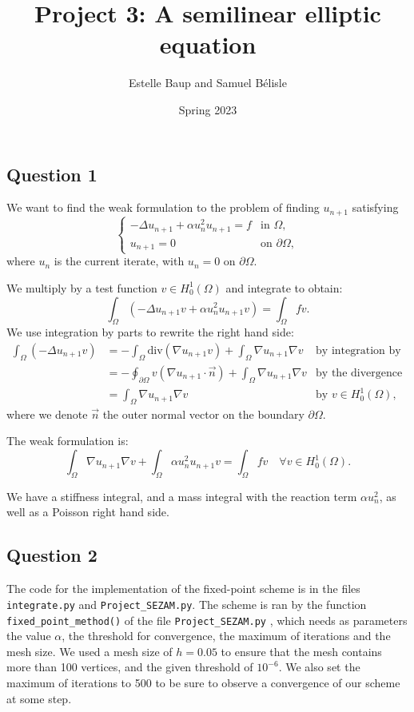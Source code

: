 \documentclass[11pt, a4paper, twoside]{article}
\newcommand{\grad}{\nabla} %
\renewcommand{\div}{\text{div}} %
\newcommand{\Hunz}{H^1_0(\Omega)}
\newcommand{\intom}{\int_\Omega}
\newcommand{\intbd}{\oint_{\partial \Omega}}
\begin{document}
\title{Project 3: A semilinear elliptic equation}
\author{Estelle Baup and Samuel Bélisle}
\date{Spring 2023}
\maketitle 

\subsection*{Question 1}
We want to find the weak formulation to the problem of finding $u_{n+1}$ satisfying
$$\begin{cases}  - \Delta u_{n+1} + \alpha u_n^2 u_{n+1} = f & \text{in } \Omega,\\
u_{n+1} = 0 &\text{on } \partial\Omega,
\end{cases}$$
where $u_n$ is the current iterate, with $u_n = 0$ on $\partial\Omega$.\newline

We multiply by a test function $v\in \Hunz$ and integrate to obtain:
$$\intom \left( -\Delta u_{n+1} v + \alpha u_n^2 u_{n+1} v \right) = \intom fv .$$
We use integration by parts to rewrite the right hand side:
\begin{align*}
 \intom (-\Delta u_{n+1} v)
 &= - \intom \div(\grad u_{n+1} v) + \intom \grad u_{n+1} \grad v
 	&\text{by integration by part}
 \\%
 &= - \intbd v (\grad u_{n+1} \cdot \vec n) + \intom \grad u_{n+1} \grad v
 	&\text{by the divergence theorem}
 \\%
 &=  \intom \grad u_{n+1} \grad v
 	&\text{by } v\in\Hunz,
\end{align*}
where we denote $\vec n$ the outer normal vector on the boundary $\partial \Omega$.

The weak formulation is:
\begin{equation}
\label{weak_f} \tag{E1}
\intom
\grad u_{n+1} \grad v
+ 
\intom
\alpha u_n^2 u_{n+1} v
= \intom fv
\quad \forall v\in\Hunz.
\end{equation}

We have a stiffness integral, and a mass integral with the reaction term $\alpha u_n^2$, as well as a Poisson right hand side.

\subsection*{Question 2}
The code for the implementation of the fixed-point scheme is in the files \verb+integrate.py+ and \verb+Project_SEZAM.py+. The scheme is ran by the function \verb+fixed_point_method()+ of the file  \verb+Project_SEZAM.py+ , which needs as parameters the value $\alpha$, the threshold for convergence, the maximum of iterations and the mesh size. We used a mesh size of $h=0.05$ to ensure that the mesh contains more than 100 vertices, and the given threshold of $10^{-6}$. We also set the maximum of iterations to 500 to be sure to observe a convergence of our scheme at some step.
\end{document}
